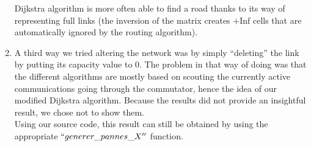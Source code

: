 \documentclass[lettersize,journal]{IEEEtran} %
\begin{document}
\begin{enumerate}
        Dijkstra algorithm is more often able to find a road thanks to its way of representing full links (the inversion of the matrix creates
        +Inf cells that are automatically ignored by the routing algorithm).
        \item A third way we tried altering the network was by simply ``deleting'' the link by putting its capacity value to 0. The problem in
        that way of doing was that the different algorithms are mostly based on scouting the currently active communications going through
        the commutator, hence the idea of our modified Dijkstra algorithm. Because the results did not provide an insightful result, we chose
        not to show them.\\
        Using our source code, this result can still be obtained by using the appropriate $``generer\_pannes\_X''$ function.
\end{enumerate}
\end{document}
